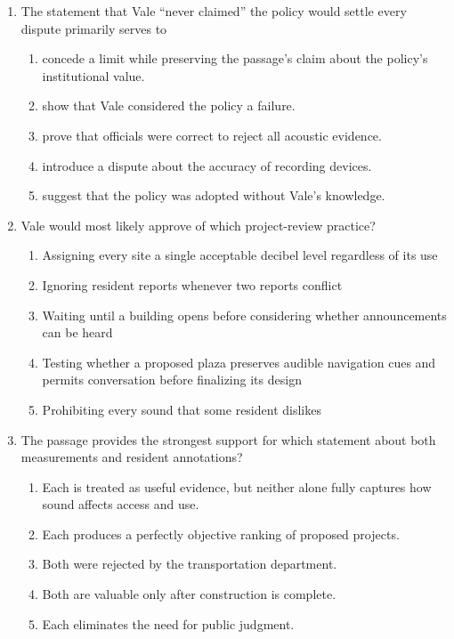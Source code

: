 \begin{enumerate}
\item The statement that Vale ``never claimed'' the policy would settle every dispute primarily serves to
\begin{enumerate}
\item[(A)] concede a limit while preserving the passage's claim about the policy's institutional value.
\item[(B)] show that Vale considered the policy a failure.
\item[(C)] prove that officials were correct to reject all acoustic evidence.
\item[(D)] introduce a dispute about the accuracy of recording devices.
\item[(E)] suggest that the policy was adopted without Vale's knowledge.
\end{enumerate}

\item Vale would most likely approve of which project-review practice?
\begin{enumerate}
\item[(A)] Assigning every site a single acceptable decibel level regardless of its use
\item[(B)] Ignoring resident reports whenever two reports conflict
\item[(C)] Waiting until a building opens before considering whether announcements can be heard
\item[(D)] Testing whether a proposed plaza preserves audible navigation cues and permits conversation before finalizing its design
\item[(E)] Prohibiting every sound that some resident dislikes
\end{enumerate}

\item The passage provides the strongest support for which statement about both measurements and resident annotations?
\begin{enumerate}
\item[(A)] Each is treated as useful evidence, but neither alone fully captures how sound affects access and use.
\item[(B)] Each produces a perfectly objective ranking of proposed projects.
\item[(C)] Both were rejected by the transportation department.
\item[(D)] Both are valuable only after construction is complete.
\item[(E)] Each eliminates the need for public judgment.
\end{enumerate}

\end{enumerate}


